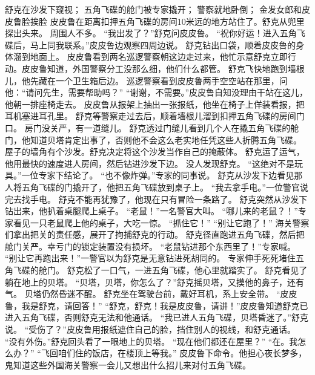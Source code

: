\documentclass[a4paper,12pt,UTF8,twoside]{ctexbook}
\begin{document}
        舒克在沙发下窥视； 
        五角飞碟的舱门被专家撬开； 
        警察就地卧倒； 
        金发女郎和皮皮鲁脸挨脸   
        皮皮鲁在距离扣押五角飞碟的房间10米远的地方站住了。舒克从兜里探出头来。 
        周围人不多。 
        “我出发了？”舒克问皮皮鲁。 
        “祝你好运！进入五角飞碟后，马上同我联系。”皮皮鲁边观察四周边说。 
        舒克钻出口袋，顺着皮皮鲁的身体溜到地面上。 
        皮皮鲁看到两名巡逻警察朝这边走过来，他忙示意舒克立即行动。皮皮鲁知道，外国警察分工没那么细，他们什么都管。 
        舒克飞快地跑到墙根儿，他先藏在一个卫生箱后边。 
        巡逻警察看到皮皮鲁两手空空站在那里，问他：“请问先生，需要帮助吗？” 
        “谢谢，不需要。”皮皮鲁自知没理由干站在这儿，他朝一排座椅走去。 
        皮皮鲁从报架上抽出一张报纸，他坐在椅子上佯装看报，把耳机塞进耳孔里。 
        舒克等警察走过去后，顺着墙根儿溜到扣押五角飞碟的房间门口。 
        房门没关严，有一道缝儿。 
        舒克透过门缝儿看到几个人在撬五角飞碟的舱门，他知道贝塔肯定出事了，否则他不会这么老实地任凭这些人折腾五角飞碟。 
        屋子的墙角有个沙发。舒克决定将这个沙发当作自己的掩蔽体。 
        舒克运了运气，他用最快的速度进人房间，然后钻进沙发下边。 
        没人发现舒克。 
        “这绝对不是玩具。”一位专家下结论了。 
        “也不像炸弹。”专家的同事说。 
        舒克从沙发下边看见那人将五角飞碟的门撬开了，他把五角飞碟放到桌子上。 
        “我去拿手电。”一位警官说完去找手电。 
        舒克不能再犹豫了，他现在只有冒险一条路了。 
        舒克突然从沙发下钻出来，他扒着桌腿爬上桌子。 
        “老鼠！”一名警官大叫。 
        “哪儿来的老鼠？！”专家看见一只老鼠爬上他的桌子，大吃一惊。 
        “抓住它！” 
        “别让它跑了！” 
        海关警察们拿出把关的责任感，展开了拘捕舒克的行动。 
        舒克径直跑进五角飞碟，然后把舱门关严。幸亏门的锁定装置没有损坏。 
        “老鼠钻进那个东西里了！”专家喊。 
        “别让它再跑出来！”一警官以为舒克是无意钻进死胡同的。 
        专家伸手死死堵住五角飞碟的舱门。 
        舒克松了一口气，一进五角飞碟，他心里就踏实了。 
        舒克看见了躺在地上的贝塔。 
        “贝塔，贝塔，你怎么了？”舒克摇贝塔，又摸他的鼻子，还有气。 
        贝塔仍然昏迷不醒。 
        舒克坐在驾驶台前，戴好耳机，系上安全带。 
        “皮皮鲁，我是舒克，请回答！” 
        “舒克，舒克！我是皮皮鲁，请讲！”皮皮鲁知道舒克已进入五角飞碟，否则舒克无法和他通话。 
        “我已进人五角飞碟，贝塔昏迷了。”舒克说。 
        “受伤了？”皮皮鲁用报纸遮住自己的脸，挡住别人的视线，和舒克通话。 
        “没有外伤。”舒克回头看了一眼地上的贝塔。 
        “现在他们都还在屋里？” 
        “在。我怎么办？” 
        “飞回咱们住的饭店，在楼顶上等我。” 
        皮皮鲁下命令。他担心夜长梦多，鬼知道这些外国海关警察一会儿又想出什么招儿来对付五角飞碟。 
\end{document}

